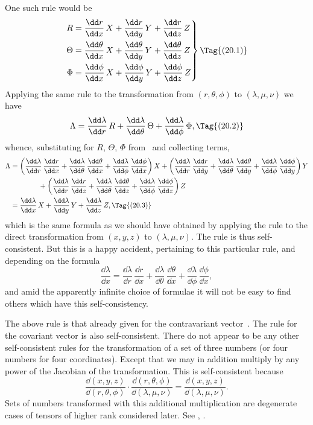 \documentclass[12pt]{book}
\begin{document}
One such rule would be
\[
\left.
\begin{alignedat}{3}
  R &= \frac{\dd r}{\dd x}\, X &&+ \frac{\dd r}{\dd y}\, Y &&+ \frac{\dd r}{\dd z}\, Z \\
  \Theta &= \frac{\dd \theta}{\dd x}\, X &&+ \frac{\dd \theta}{\dd y}\, Y &&+ \frac{\dd \theta}{\dd z}\, Z \\
  \Phi &= \frac{\dd \phi}{\dd x}\, X &&+ \frac{\dd \phi}{\dd y}\, Y &&+ \frac{\dd \phi}{\dd z}\, Z
  \end{alignedat}\right\}
\Tag{(20.1)}
\]
Applying the same rule to the transformation from $(r, \theta, \phi)$ to $(\lambda, \mu, \nu)$
we have
\[
\Lambda = \frac{\dd \lambda}{\dd r}\, R + \frac{\dd \lambda}{\dd \theta}\, \Theta + \frac{\dd \lambda}{\dd \phi}\, \Phi,
\Tag{(20.2)}
\]
whence, substituting for $R$, $\Theta$, $\Phi$ from~ and collecting terms,
\begin{align*}
  \Lambda &= \left(\frac{\dd \lambda}{\dd r}\, \frac{\dd r}{\dd x} + \frac{\dd \lambda}{\dd \theta}\, \frac{\dd \theta}{\dd x} + \frac{\dd \lambda}{\dd \phi}\, \frac{\dd \phi}{\dd x}\right) X
  + \left(\frac{\dd \lambda}{\dd r}\, \frac{\dd r}{\dd y} + \frac{\dd \lambda}{\dd \theta}\, \frac{\dd \theta}{\dd y} + \frac{\dd \lambda}{\dd \phi}\, \frac{\dd \phi}{\dd y}\right) Y \\
  &\qquad\qquad+ \left(\frac{\dd \lambda}{\dd r}\, \frac{\dd r}{\dd z} + \frac{\dd \lambda}{\dd \theta}\, \frac{\dd \theta}{\dd z} + \frac{\dd \lambda}{\dd \phi}\, \frac{\dd \phi}{\dd z}\right) Z \\
  &= \frac{\dd\lambda}{\dd x}\, X + \frac{\dd\lambda}{\dd y}\, Y + \frac{\dd\lambda}{\dd z}\, Z,
  \Tag{(20.3)}
\end{align*}
which is the same formula as we should have obtained by applying the rule
to the direct transformation from $(x, y, z)$ to $(\lambda, \mu, \nu)$. The rule is thus self-consistent.
But this is a happy accident, pertaining to this particular rule,
and depending on the formula
\[
\frac{\dd\lambda}{\dd x}
= \frac{\dd \lambda}{\dd r}\, \frac{\dd r}{\dd x}
+ \frac{\dd \lambda}{\dd \theta}\, \frac{\dd \theta}{\dd x}
+ \frac{\dd \lambda}{\dd \phi}\, \frac{\dd \phi}{\dd x},
\]
and amid the apparently infinite choice of formulae it will not be easy to find
others which have this self-consistency.

The above rule is that already given for the contravariant vector~.
The rule for the covariant vector is also self-consistent. There do not appear
to be any other self-consistent rules for the transformation of a set of three
numbers (or four numbers for four coordinates)\footnotemark.\footnotetext
  {Except that we may in addition multiply by any power of the Jacobian of the transformation.
  This is self-consistent because
  \[
  \frac{\dd(x, y, z)}{\dd(r, \theta, \phi)} \cdot \frac{\dd(r, \theta, \phi)}{\dd(\lambda, \mu, \nu)}
  = \frac{\dd(x, y, z)}{\dd(\lambda, \mu, \nu)}.
  \]
  Sets of numbers transformed with this additional multiplication are degenerate cases of tensors
  of higher rank considered later. See , .}
\end{document}
